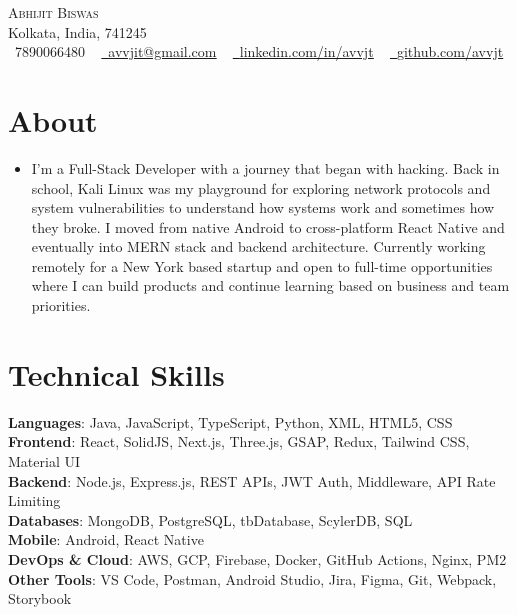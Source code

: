 \documentclass[letterpaper,11pt]{article}
\begin{document}

\begin{center}
    {\Huge \scshape Abhijit Biswas} \\ \vspace{1pt}
    Kolkata, India, 741245 \\ \vspace{1pt}
    \small \raisebox{-0.1\height}\faPhone\ 7890066480 ~ \href{mailto:x@gmail.com}{\raisebox{-0.2\height}\faEnvelope\  \underline{avvjit@gmail.com}} ~ 
    \href{https://linkedin.com/in//}{\raisebox{-0.2\height}\faLinkedin\ \underline{linkedin.com/in/avvjt}}  ~
    \href{https://github.com/}{\raisebox{-0.2\height}\faGithub\ \underline{github.com/avvjt}}
    \vspace{-8pt}
\end{center}

\section{About}
\vspace{-2pt}
\begin{itemize}[leftmargin=0.15in, label={}]
\item \small{I’m a Full-Stack Developer with a journey that began with hacking. Back in school, Kali Linux was my playground for exploring network protocols and system vulnerabilities to understand how systems work and sometimes how they broke. I moved from native Android to cross-platform React Native and eventually into MERN stack and backend architecture. Currently working remotely for a New York based startup and open to full-time opportunities where I can build products and continue learning based on business and team priorities.}
\end{itemize}
\vspace{-6pt}

\section{Technical Skills}
 \begin{itemize}[leftmargin=0.15in, label={}]
    \small{\item{
     \textbf{Languages}{:} Java, JavaScript, TypeScript, Python, XML, HTML5, CSS \\
     \textbf{Frontend}{:} React, SolidJS, Next.js, Three.js, GSAP, Redux, Tailwind CSS, Material UI \\
     \textbf{Backend}{:} Node.js, Express.js, REST APIs, JWT Auth, Middleware, API Rate Limiting \\
     \textbf{Databases}{:} MongoDB, PostgreSQL, tbDatabase, ScylerDB, SQL \\
     \textbf{Mobile}{:} Android, React Native \\
     \textbf{DevOps \& Cloud}{:} AWS, GCP, Firebase, Docker, GitHub Actions, Nginx, PM2 \\
     \textbf{Other Tools}{:} VS Code, Postman, Android Studio, Jira, Figma, Git, Webpack, Storybook
    }}
 \end{itemize}
 \vspace{-12pt}
\end{document}
